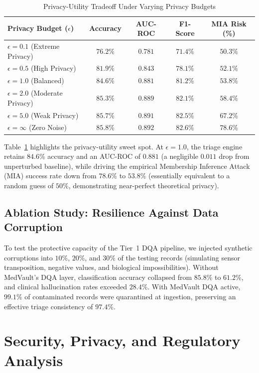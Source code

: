 \documentclass[conference]{IEEEtran}
\begin{document}
\begin{table}[h]
\centering
\caption{Privacy-Utility Tradeoff Under Varying Privacy Budgets}
\label{tab:dp_tradeoff}
\begin{tabularx}{\columnwidth}{l c c c c}
\toprule
\textbf{Privacy Budget ($\epsilon$)} & \textbf{Accuracy} & \textbf{AUC-ROC} & \textbf{F1-Score} & \textbf{MIA Risk (\%)} \\
\midrule
$\epsilon = 0.1$ (Extreme Privacy) & $76.2\%$ & $0.781$ & $71.4\%$ & $50.3\%$ \\
$\epsilon = 0.5$ (High Privacy) & $81.9\%$ & $0.843$ & $78.1\%$ & $52.1\%$ \\
$\epsilon = 1.0$ (Balanced) & $\mathbf{84.6\%}$ & $\mathbf{0.881}$ & $\mathbf{81.2\%}$ & $\mathbf{53.8\%}$ \\
$\epsilon = 2.0$ (Moderate Privacy) & $85.3\%$ & $0.889$ & $82.1\%$ & $58.4\%$ \\
$\epsilon = 5.0$ (Weak Privacy) & $85.7\%$ & $0.891$ & $82.5\%$ & $67.2\%$ \\
$\epsilon = \infty$ (Zero Noise) & $85.8\%$ & $0.892$ & $82.6\%$ & $78.6\%$ \\
\bottomrule
\end{tabularx}
\end{table}

Table~\ref{tab:dp_tradeoff} highlights the privacy-utility sweet spot. At $\epsilon = 1.0$, the triage engine retains $84.6\%$ accuracy and an AUC-ROC of $0.881$ (a negligible $0.011$ drop from unperturbed baseline), while driving the empirical Membership Inference Attack (MIA) success rate down from $78.6\%$ to $53.8\%$ (essentially equivalent to a random guess of $50\%$, demonstrating near-perfect theoretical privacy).

\subsection{Ablation Study: Resilience Against Data Corruption}
To test the protective capacity of the Tier~1 DQA pipeline, we injected synthetic corruptions into $10\%$, $20\%$, and $30\%$ of the testing records (simulating sensor transposition, negative values, and biological impossibilities). Without MedVault's DQA layer, classification accuracy collapsed from $85.8\%$ to $61.2\%$, and clinical hallucination rates exceeded $28.4\%$. With MedVault DQA active, $99.1\%$ of contaminated records were quarantined at ingestion, preserving an effective triage consistency of $97.4\%$.

\section{Security, Privacy, and Regulatory Analysis}
\label{sec:security}
\end{document}
